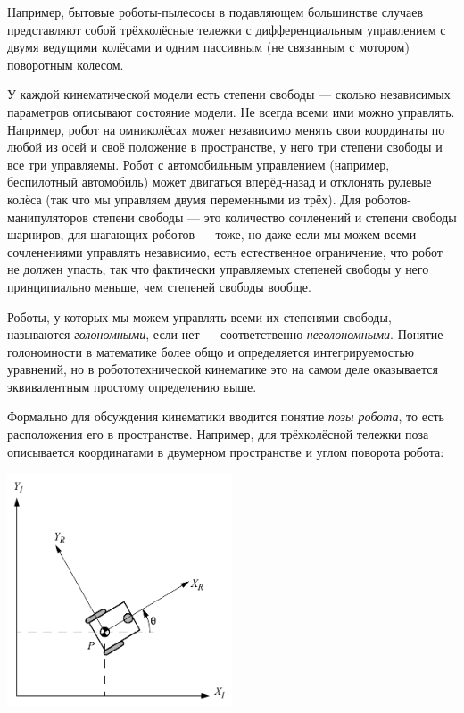 \documentclass{../../text-style}
\begin{document}
Например, бытовые роботы-пылесосы в подавляющем большинстве случаев представляют собой трёхколёсные тележки с дифференциальным управлением с двумя ведущими колёсами и одним пассивным (не связанным с мотором) поворотным колесом.

У каждой кинематической модели есть степени свободы --- сколько независимых параметров описывают состояние модели.
Не всегда всеми ими можно управлять.
Например, робот на омниколёсах может независимо менять свои координаты по любой из осей и своё положение в пространстве, у него три степени свободы и все три управляемы.
Робот с автомобильным управлением (например, беспилотный автомобиль) может двигаться вперёд-назад и отклонять рулевые колёса (так что мы управляем двумя переменными из трёх).
Для роботов-манипуляторов степени свободы --- это количество сочленений и степени свободы шарниров, для шагающих роботов --- тоже, но даже если мы можем всеми сочленениями управлять независимо, есть естественное ограничение, что робот не должен упасть, так что фактически управляемых степеней свободы у него принципиально меньше, чем степеней свободы вообще.

Роботы, у которых мы можем управлять всеми их степенями свободы, называются \emph{голономными}, если нет --- соответственно \emph{неголономными}.
Понятие голономности в математике более общо и определяется интегрируемостью уравнений, но в робототехнической кинематике это на самом деле оказывается эквивалентным простому определению выше.

Формально для обсуждения кинематики вводится понятие \emph{позы робота}, то есть расположения его в пространстве.
Например, для трёхколёсной тележки поза описывается координатами в двумерном пространстве и углом поворота робота:

\begin{center}
    \includegraphics[width=0.5\textwidth]{pose.png}
\end{center}
\end{document}
